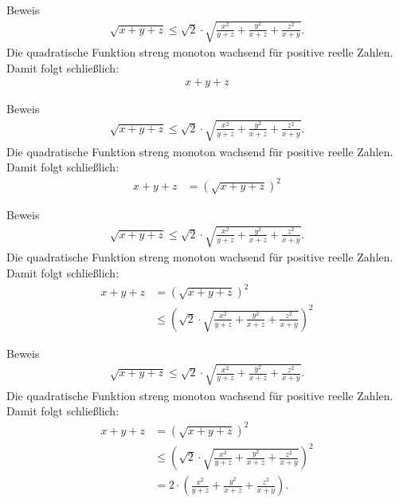 \documentclass[10pt]{beamer}
\begin{document}
\begin{frame}{Beweis}
    \begin{align*}
        \sqrt{x + y + z}
        \leq \sqrt{2} \cdot \sqrt{\frac{x^{2}}{y + z} + \frac{y^{2}}{x + z} + \frac{z^{2}}{x + y}}.
    \end{align*}
    Die quadratische Funktion streng monoton wachsend für positive reelle Zahlen. Damit folgt schließlich:
    \begin{align*}
        x + y + z
    \end{align*}
\end{frame}



\begin{frame}{Beweis}
    \begin{align*}
        \sqrt{x + y + z}
        \leq \sqrt{2} \cdot \sqrt{\frac{x^{2}}{y + z} + \frac{y^{2}}{x + z} + \frac{z^{2}}{x + y}}.
    \end{align*}
    Die quadratische Funktion streng monoton wachsend für positive reelle Zahlen. Damit folgt schließlich:
    \begin{align*}
        x + y + z
        & = \left( \sqrt{x + y + z} \right)^{2}
    \end{align*}
\end{frame}



\begin{frame}{Beweis}
    \begin{align*}
        \sqrt{x + y + z}
        \leq \sqrt{2} \cdot \sqrt{\frac{x^{2}}{y + z} + \frac{y^{2}}{x + z} + \frac{z^{2}}{x + y}}.
    \end{align*}
    Die quadratische Funktion streng monoton wachsend für positive reelle Zahlen. Damit folgt schließlich:
    \begin{align*}
        x + y + z
        & = \left( \sqrt{x + y + z} \right)^{2} \\
        & \leq \left( \sqrt{2} \cdot \sqrt{\frac{x^{2}}{y + z} + \frac{y^{2}}{x + z} + \frac{z^{2}}{x + y}} \right)^{2}
    \end{align*}
\end{frame}



\begin{frame}{Beweis}
    \begin{align*}
        \sqrt{x + y + z}
        \leq \sqrt{2} \cdot \sqrt{\frac{x^{2}}{y + z} + \frac{y^{2}}{x + z} + \frac{z^{2}}{x + y}}.
    \end{align*}
    Die quadratische Funktion streng monoton wachsend für positive reelle Zahlen. Damit folgt schließlich:
    \begin{align*}
        x + y + z
        & = \left( \sqrt{x + y + z} \right)^{2} \\
        & \leq \left( \sqrt{2} \cdot \sqrt{\frac{x^{2}}{y + z} + \frac{y^{2}}{x + z} + \frac{z^{2}}{x + y}} \right)^{2} \\
         & = 2 \cdot \left( \frac{x^{2}}{y + z} + \frac{y^{2}}{x + z} + \frac{z^{2}}{x + y} \right).
    \end{align*}
\end{frame}
\end{document}

